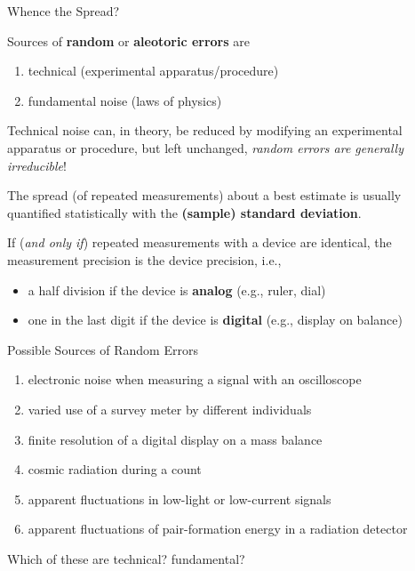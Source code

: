 \documentclass[aspectratio=1610]{beamer}
\begin{document}
\begin{frame}{Whence the Spread?}

Sources of {\bf random} or {\bf aleotoric  errors} are
\begin{enumerate}
 \item technical (experimental apparatus/procedure)
 \item fundamental noise (laws of physics)
\end{enumerate}


\vfill
\pause

Technical noise can, in theory, be reduced by modifying an experimental apparatus or procedure, but left unchanged, {\it random errors are generally irreducible}!

\vfill
\pause

The spread (of repeated measurements) about a best estimate is usually quantified statistically with the {\bf (sample) standard deviation}.

\vfill
\pause

If ({\it and only if}) repeated measurements with a device are identical, the measurement precision is the device precision, i.e.,
\begin{itemize}
 \item a half division if the device is {\bf analog} (e.g., ruler, dial)
 \item one in the last digit if the device is {\bf digital} (e.g., display on balance)
\end{itemize}

\end{frame}


\begin{frame}{Possible Sources of Random Errors}

\begin{enumerate}
 \item electronic noise when measuring a signal with an oscilloscope
 \item varied use of a survey meter by different individuals
 \item finite resolution of a digital display on a mass balance
 \item cosmic radiation during a count
 \item apparent fluctuations in low-light or low-current signals
 \item apparent fluctuations of pair-formation energy in a radiation detector
\end{enumerate}

\vfill

Which of these are technical?  fundamental?

\end{frame}
\end{document}
